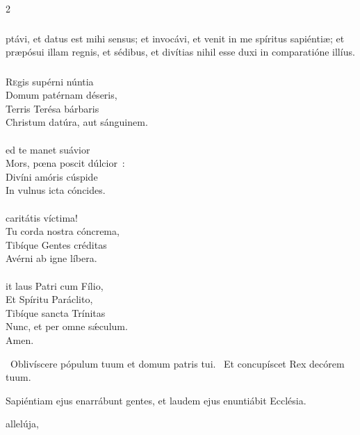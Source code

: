 \documentclass[9pt,twoside]{extarticle}
\begin{document}
\begin{multicols}{2}
{\subsubsection*{}
ptávi, et datus est mihi sensus; et invocávi, et venit in me spíritus sapiéntiæ; et præpósui illam regnis, et sédibus, et divítias nihil esse duxi in comparatióne illíus.

\subsubsection*{\center {}}
\begin{center}\end{center}
\lettrine{R}egis supérni núntia\\
Domum patérnam déseris,\\
Terris Terésa bárbaris\\
Christum datúra, aut sánguinem.\\
\\
ed te manet suávior\\
Mors, pœna poscit dúlcior~:\\
Divíni amóris cúspide\\
In vulnus icta cóncides.\\
\\
 caritátis víctima!\\
Tu corda nostra cóncrema,\\
Tibíque Gentes créditas\\
Avérni ab igne líbera.\\
\\
it laus Patri cum Fílio,\\
Et Spíritu Paráclito,\\
Tibíque sancta Trínitas\\
Nunc, et per omne sǽculum.\\
Amen.

\begin{tightlist}{}
\item {}~Oblivíscere pópulum tuum et domum patris tui. ~Et concupíscet Rex decórem tuum.
\item {} Sapiéntiam ejus enarrábunt gentes, et laudem ejus enuntiábit Ecclésia.
\item {} allelúja, 
\end{tightlist}

}
\end{multicols}
\end{document}

